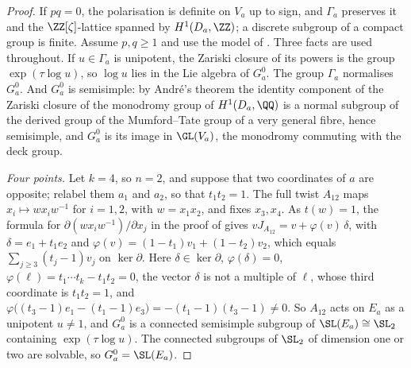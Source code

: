 \begin{proof}
If $pq=0$, the polarisation is definite on $V_{a}$ up to sign, and
$\Gamma_{a}$ preserves it and the $\ZZ[\zeta]$-lattice spanned by
$H^{1}(D_{a},\ZZ)$; a discrete subgroup of a compact group is finite. Assume
$p,q\ge1$ and use the model of . Three facts are used
throughout. If $u\in\Gamma_{a}$ is unipotent, the Zariski closure of its
powers is the group $\exp(\tau\log u)$, so $\log u$ lies in the Lie algebra
of $G_{a}^{0}$. The group $\Gamma_{a}$ normalises $G_{a}^{0}$. And $G_{a}^{0}$
is semisimple: by Andr\'e's theorem \cite[Theorem~1]{And92} the identity
component of the Zariski closure of the monodromy group of
$H^{1}(D_{a},\QQ)$ is a normal subgroup of the derived group of the
Mumford--Tate group of a very general fibre, hence semisimple, and
$G_{a}^{0}$ is its image in $\GL(V_{a})$, the monodromy commuting with the
deck group.

\emph{Four points.} Let $k=4$, so $n=2$, and suppose that two coordinates
of $a$ are opposite; relabel them $a_{1}$ and $a_{2}$, so that $t_{1}t_{2}=1$.
The full twist $A_{12}$ maps $x_{i}\mapsto wx_{i}w^{-1}$ for $i=1,2$, with
$w=x_{1}x_{2}$, and fixes $x_{3},x_{4}$. As $t(w)=1$, the formula for
$\partial(wx_{i}w^{-1})/\partial x_{j}$ in the proof of 
gives $vJ_{A_{12}}=v+\varphi(v)\,\delta$, with $\delta=e_{1}+t_{1}e_{2}$ and
$\varphi(v)=(1-t_{1})v_{1}+(1-t_{2})v_{2}$, which equals
$\sum_{j\ge3}(t_{j}-1)v_{j}$ on $\ker\partial$. Here $\delta\in\ker\partial$,
$\varphi(\delta)=0$, $\varphi(\ell)=t_{1}\cdots t_{k}-t_{1}t_{2}=0$, the
vector $\delta$ is not a multiple of $\ell$, whose third coordinate is
$t_{1}t_{2}=1$, and $\varphi\bigl((t_{3}-1)e_{1}-(t_{1}-1)e_{3}\bigr)
=-(t_{1}-1)(t_{3}-1)\ne0$. So $A_{12}$ acts on $E_{a}$ as a unipotent
$u\ne1$, and $G_{a}^{0}$ is a connected semisimple subgroup of
$\SL(E_{a})\cong\SL_{2}$ containing $\exp(\tau\log u)$. The connected
subgroups of $\SL_{2}$ of dimension one or two are solvable, so
$G_{a}^{0}=\SL(E_{a})$.


\end{proof}
